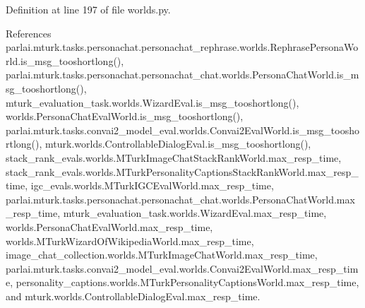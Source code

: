 Definition at line 197 of file worlds.\+py.



References parlai.\+mturk.\+tasks.\+personachat.\+personachat\+\_\+rephrase.\+worlds.\+Rephrase\+Persona\+World.\+is\+\_\+msg\+\_\+tooshortlong(), parlai.\+mturk.\+tasks.\+personachat.\+personachat\+\_\+chat.\+worlds.\+Persona\+Chat\+World.\+is\+\_\+msg\+\_\+tooshortlong(), mturk\+\_\+evaluation\+\_\+task.\+worlds.\+Wizard\+Eval.\+is\+\_\+msg\+\_\+tooshortlong(), worlds.\+Persona\+Chat\+Eval\+World.\+is\+\_\+msg\+\_\+tooshortlong(), parlai.\+mturk.\+tasks.\+convai2\+\_\+model\+\_\+eval.\+worlds.\+Convai2\+Eval\+World.\+is\+\_\+msg\+\_\+tooshortlong(), mturk.\+worlds.\+Controllable\+Dialog\+Eval.\+is\+\_\+msg\+\_\+tooshortlong(), stack\+\_\+rank\+\_\+evals.\+worlds.\+M\+Turk\+Image\+Chat\+Stack\+Rank\+World.\+max\+\_\+resp\+\_\+time, stack\+\_\+rank\+\_\+evals.\+worlds.\+M\+Turk\+Personality\+Captions\+Stack\+Rank\+World.\+max\+\_\+resp\+\_\+time, igc\+\_\+evals.\+worlds.\+M\+Turk\+I\+G\+C\+Eval\+World.\+max\+\_\+resp\+\_\+time, parlai.\+mturk.\+tasks.\+personachat.\+personachat\+\_\+chat.\+worlds.\+Persona\+Chat\+World.\+max\+\_\+resp\+\_\+time, mturk\+\_\+evaluation\+\_\+task.\+worlds.\+Wizard\+Eval.\+max\+\_\+resp\+\_\+time, worlds.\+Persona\+Chat\+Eval\+World.\+max\+\_\+resp\+\_\+time, worlds.\+M\+Turk\+Wizard\+Of\+Wikipedia\+World.\+max\+\_\+resp\+\_\+time, image\+\_\+chat\+\_\+collection.\+worlds.\+M\+Turk\+Image\+Chat\+World.\+max\+\_\+resp\+\_\+time, parlai.\+mturk.\+tasks.\+convai2\+\_\+model\+\_\+eval.\+worlds.\+Convai2\+Eval\+World.\+max\+\_\+resp\+\_\+time, personality\+\_\+captions.\+worlds.\+M\+Turk\+Personality\+Captions\+World.\+max\+\_\+resp\+\_\+time, and mturk.\+worlds.\+Controllable\+Dialog\+Eval.\+max\+\_\+resp\+\_\+time.

